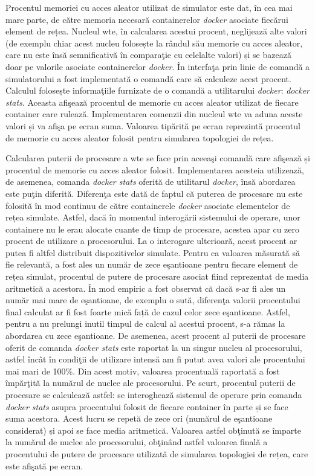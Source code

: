 Procentul memoriei cu acces aleator utilizat de simulator este dat, în cea mai mare parte, de către memoria necesară containerelor \textit{docker} asociate fiecărui element de rețea. Nucleul \gls{wte}, în calcularea acestui procent, neglijează alte valori (de exemplu chiar acest nucleu folosește la rândul său memorie cu acces aleator, care nu este însă semnificativă în comparaţie cu celelalte valori) și se bazează
doar pe valorile asociate containerelor \textit{docker}. În interfaţa prin linie de comandă a simulatorului a fost implementată o comandă care să calculeze acest procent. Calculul folosește informaţiile furnizate de o comandă a utilitarului \textit{docker}: \textit{docker stats}. Aceasta afişează procentul de memorie cu acces aleator utilizat de fiecare container care rulează. Implementarea comenzii din nucleul \gls{wte} va aduna aceste valori și va afişa pe ecran suma. Valoarea tipărită pe ecran reprezintă procentul de memorie cu acces aleator folosit pentru simularea topologiei de rețea.

Calcularea puterii de procesare a \gls{wte} se face prin aceeaşi comandă care afişează și procentul de memorie cu acces aleator folosit. Implementarea acesteia utilizează, de asemenea, comanda \textit{docker stats} oferită de utilitarul \textit{docker}, însă abordarea este puţin diferită. Diferenţa este dată de faptul că puterea de procesare nu este folosită în mod continuu de către containerele \textit{docker} asociate elementelor de rețea simulate. Astfel, dacă în momentul interogării sistemului de operare, unor containere nu le erau alocate cuante de timp de procesare, acestea apar cu zero procent de utilizare a procesorului. La o interogare ulterioară, acest procent ar putea fi altfel distribuit dispozitivelor simulate. Pentru ca valoarea măsurată să fie relevantă, a fost ales un număr de zece eşantioane pentru fiecare element de rețea simulat, procentul de putere de procesare asociat fiind reprezentat de media aritmetică a acestora. În mod empiric a fost observat că dacă s-ar fi ales un număr mai mare de eşantioane, de exemplu o sută, diferenţa valorii procentului final calculat ar fi fost foarte mică față de cazul celor zece eşantioane. Astfel, pentru a nu prelungi inutil timpul de calcul al acestui procent, s-a rămas la abordarea cu zece eşantioane. De asemenea, acest procent al puterii de procesare oferit de comanda \textit{docker stats} este raportat la un singur nucleu al procesorului, astfel încât în condiţii de utilizare intensă am fi putut avea valori ale procentului mai mari de 100\%. Din acest motiv, valoarea procentuală raportată a fost împărţită la numărul de nuclee ale procesorului. Pe scurt, procentul puterii de procesare se calculează astfel: se interoghează sistemul de operare prin comanda \textit{docker stats} asupra procentului folosit de fiecare container în parte și se face suma acestora. Acest lucru se repetă de zece ori (numărul de eşantioane considerat) și apoi se face media aritmetică. Valoarea astfel obţinută se împarte la numărul de nuclee ale procesorului, obţinând astfel valoarea finală a procentului de putere de procesare utilizată de simularea topologiei de rețea, care este afişată pe ecran.

